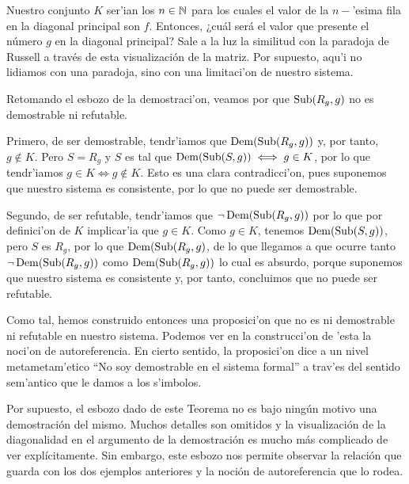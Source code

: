 Nuestro conjunto $K$ ser'ian los $n\in \mathbb N$ para los cuales el valor de la $n-$'esima fila en la diagonal principal son $f$. Entonces, ¿cuál será el valor que presente el número $g$ en la diagonal principal? Sale a la luz la similitud con la paradoja de Russell a través de esta visualización de la matriz. Por supuesto, aqu'i no lidiamos con una paradoja, sino con una limitaci'on de nuestro sistema. 

Retomando el esbozo de la demostraci'on, veamos por que $\operatorname{Sub}(R_g,g)$ no es demostrable ni refutable. 

Primero, de ser demostrable, tendr'iamos que $\operatorname{Dem}(\operatorname{Sub}(R_g,g))$ y, por tanto, $g\notin K$. Pero $S= R_g$ y $S$ es tal que $\operatorname{Dem}(\operatorname{Sub}(S, g))\iff g\in K$, por lo que tendr'iamos $g\in K \iff g\notin K$. Esto es una clara contradicci'on, pues suponemos que nuestro sistema es consistente, por lo que no puede ser demostrable.

Segundo, de ser refutable, tendr'iamos que $\lnot \operatorname{Dem}(\operatorname{Sub}(R_g,g))$ por lo que por definici'on de $K$ implicar'ia que $g\in K$. Como $g\in K$, tenemos $\operatorname{Dem}(\operatorname{Sub}(S, g))$, pero $S$ es $R_g$, por lo que $\operatorname{Dem}(\operatorname{Sub}(R_g, g)$, de lo que llegamos a que ocurre tanto $\lnot \operatorname{Dem}(\operatorname{Sub}(R_g,g))$ como $\operatorname{Dem}(\operatorname{Sub}(R_g,g))$ lo cual es absurdo, porque suponemos que nuestro sistema es consistente y, por tanto, concluimos que no puede ser refutable.

Como tal, hemos construido entonces una proposici'on que no es ni demostrable ni refutable en nuestro sistema. Podemos ver en la construcci'on de 'esta la noci'on de autoreferencia. En cierto sentido, la proposici'on dice a un nivel metametam'etico \enquote{No soy demostrable en el sistema formal} 
a trav'es del sentido sem'antico que le damos a los s'imbolos. 

Por supuesto, el esbozo dado de este Teorema no es bajo ningún motivo una demostración del mismo. Muchos detalles son omitidos y la visualización de la diagonalidad en el argumento de la demostración es mucho más complicado de ver explícitamente. Sin embargo, este esbozo nos permite observar la relación que guarda con los dos ejemplos anteriores y la noción de autoreferencia que lo rodea. 

